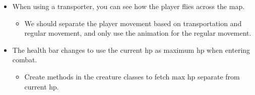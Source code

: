 \begin{itemize}[$\circ$]
\begin{itemize}[$-$]
\end{itemize}
\item When using a transporter, you can see how the player flies across the map.
\begin{itemize}[$-$]
	\item We should separate the player movement based on transportation and regular movement, and only use the animation for the regular movement.
\end{itemize}
\item The health bar changes to use the current hp as maximum hp when entering combat.
\begin{itemize}[$-$]
	\item Create methods in the creature classes to fetch max hp separate from current hp.
\end{itemize}
\end{itemize}
